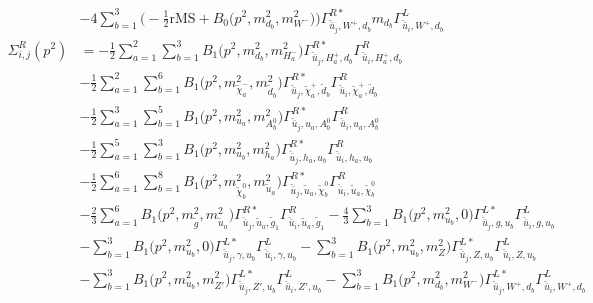 \begin{itemize}
\begin{align}
 &-4 \sum_{b=1}^{3}\Big(-\frac{1}{2} \text{rMS}  + {B_0\Big(p^{2},m^2_{d_{{b}}},m^2_{W^-}\Big)}\Big){\Gamma^{R*}_{\check{\bar{u}}_{{j}},W^+,d_{{b}}}} m_{d_{{b}}} {\Gamma^L_{\check{\bar{u}}_{{i}},W^+,d_{{b}}}}  \\ 
\Sigma^R_{i,j}(p^2) &= -\frac{1}{2} \sum_{a=1}^{2}\sum_{b=1}^{3}{B_1\Big(p^{2},m^2_{d_{{b}}},m^2_{H^-_{{a}}}\Big)} {\Gamma^{R*}_{\check{\bar{u}}_{{j}},H^+_{{a}},d_{{b}}}} {\Gamma^R_{\check{\bar{u}}_{{i}},H^+_{{a}},d_{{b}}}}  \nonumber \\ 
 &-\frac{1}{2} \sum_{a=1}^{2}\sum_{b=1}^{6}{B_1\Big(p^{2},m^2_{\tilde{\chi}^-_{{a}}},m^2_{\tilde{d}_{{b}}}\Big)} {\Gamma^{R*}_{\check{\bar{u}}_{{j}},\tilde{\chi}^+_{{a}},\tilde{d}_{{b}}}} {\Gamma^R_{\check{\bar{u}}_{{i}},\tilde{\chi}^+_{{a}},\tilde{d}_{{b}}}}  \nonumber \\ 
 &-\frac{1}{2} \sum_{a=1}^{3}\sum_{b=1}^{5}{B_1\Big(p^{2},m^2_{u_{{a}}},m^2_{A^0_{{b}}}\Big)} {\Gamma^{R*}_{\check{\bar{u}}_{{j}},u_{{a}},A^0_{{b}}}} {\Gamma^R_{\check{\bar{u}}_{{i}},u_{{a}},A^0_{{b}}}}  \nonumber \\ 
 &-\frac{1}{2} \sum_{a=1}^{5}\sum_{b=1}^{3}{B_1\Big(p^{2},m^2_{u_{{b}}},m^2_{h_{{a}}}\Big)} {\Gamma^{R*}_{\check{\bar{u}}_{{j}},h_{{a}},u_{{b}}}} {\Gamma^R_{\check{\bar{u}}_{{i}},h_{{a}},u_{{b}}}}  \nonumber \\ 
 &-\frac{1}{2} \sum_{a=1}^{6}\sum_{b=1}^{8}{B_1\Big(p^{2},m^2_{\tilde{\chi}^0_{{b}}},m^2_{\tilde{u}_{{a}}}\Big)} {\Gamma^{R*}_{\check{\bar{u}}_{{j}},\tilde{u}_{{a}},\tilde{\chi}^0_{{b}}}} {\Gamma^R_{\check{\bar{u}}_{{i}},\tilde{u}_{{a}},\tilde{\chi}^0_{{b}}}}  \nonumber \\ 
 &-\frac{2}{3} \sum_{a=1}^{6}{B_1\Big(p^{2},m^2_{\tilde{g}},m^2_{\tilde{u}_{{a}}}\Big)} {\Gamma^{R*}_{\check{\bar{u}}_{{j}},\tilde{u}_{{a}},\tilde{g}_{{1}}}} {\Gamma^R_{\check{\bar{u}}_{{i}},\tilde{u}_{{a}},\tilde{g}_{{1}}}}  -\frac{4}{3} \sum_{b=1}^{3}{B_1\Big(p^{2},m^2_{u_{{b}}},0\Big)} {\Gamma^{L*}_{\check{\bar{u}}_{{j}},g,u_{{b}}}} {\Gamma^L_{\check{\bar{u}}_{{i}},g,u_{{b}}}}  \nonumber \\ 
 &- \sum_{b=1}^{3}{B_1\Big(p^{2},m^2_{u_{{b}}},0\Big)} {\Gamma^{L*}_{\check{\bar{u}}_{{j}},\gamma,u_{{b}}}} {\Gamma^L_{\check{\bar{u}}_{{i}},\gamma,u_{{b}}}}  - \sum_{b=1}^{3}{B_1\Big(p^{2},m^2_{u_{{b}}},m^2_{Z}\Big)} {\Gamma^{L*}_{\check{\bar{u}}_{{j}},Z,u_{{b}}}} {\Gamma^L_{\check{\bar{u}}_{{i}},Z,u_{{b}}}}  \nonumber \\ 
 &- \sum_{b=1}^{3}{B_1\Big(p^{2},m^2_{u_{{b}}},m^2_{{Z'}}\Big)} {\Gamma^{L*}_{\check{\bar{u}}_{{j}},{Z'},u_{{b}}}} {\Gamma^L_{\check{\bar{u}}_{{i}},{Z'},u_{{b}}}}  - \sum_{b=1}^{3}{B_1\Big(p^{2},m^2_{d_{{b}}},m^2_{W^-}\Big)} {\Gamma^{L*}_{\check{\bar{u}}_{{j}},W^+,d_{{b}}}} {\Gamma^L_{\check{\bar{u}}_{{i}},W^+,d_{{b}}}}  \\ 

\end{align}
\end{itemize}
